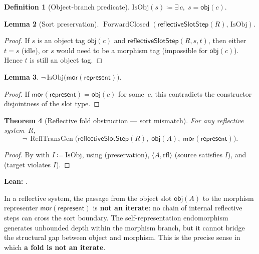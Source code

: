 \documentclass[11pt]{article}
\theoremstyle{plain}
\newtheorem{theorem}{Theorem}[section]
\newtheorem{lemma}[theorem]{Lemma}
\theoremstyle{definition}
\newtheorem{definition}[theorem]{Definition}
\theoremstyle{remark}
\newcommand{\ReflTransGen}{\operatorname{ReflTransGen}}
\newcommand{\ForwardClosed}{\operatorname{ForwardClosed}}
\newcommand{\obj}{\mathsf{obj}}
\newcommand{\mor}{\mathsf{mor}}
\newcommand{\represent}{\mathsf{represent}}
\begin{document}
\begin{definition}[Object-branch predicate]\label{def:isobjslot}
$\mathrm{IsObj}(s) \coloneqq \exists\, c,\; s = \obj(c)$.
\end{definition}

\begin{lemma}[Sort preservation]\label{lem:sort-preservation}
$\ForwardClosed(\mathsf{reflectiveSlotStep}(R),\, \mathrm{IsObj})$.
\end{lemma}

\begin{proof}
If $s$ is an object tag $\obj(c)$ and $\mathsf{reflectiveSlotStep}(R,s,t)$, then either
$t = s$ (idle), or $s$ would need to be a morphism tag (impossible for $\obj(c)$).
Hence $t$ is still an object tag.
\end{proof}

\begin{lemma}\label{lem:represent-not-obj}
$\lnot\, \mathrm{IsObj}\bigl(\mor(\represent)\bigr)$.
\end{lemma}

\begin{proof}
If $\mor(\represent) = \obj(c)$ for some~$c$, this contradicts the constructor
disjointness of the slot type.
\end{proof}

\begin{theorem}[Reflective fold obstruction --- sort mismatch]\label{thm:reflective-fold}
For any reflective system~$R$,
\[
  \lnot\, \ReflTransGen\bigl(\mathsf{reflectiveSlotStep}(R),\;
  \obj(A),\; \mor(\represent)\bigr).
\]
\end{theorem}

\begin{proof}
By  with $I \coloneqq \mathrm{IsObj}$, using
 (preservation), $\langle A, \mathrm{rfl}\rangle$
(source satisfies $I$), and  (target violates $I$).
\end{proof}

\smallskip
\noindent\textbf{Lean:}
.

\begin{keybox}[title={Sort structure is a fold boundary}]
In a reflective system, the passage from the object slot $\obj(A)$ to the morphism
representer $\mor(\represent)$ is \textbf{not an iterate}: no chain of internal
reflective steps can cross the sort boundary.  The self-representation endomorphism
generates unbounded depth within the morphism branch, but it cannot bridge the
structural gap between object and morphism.  This is the precise sense in which
\textbf{a fold is not an iterate}.
\end{keybox}
\end{document}
